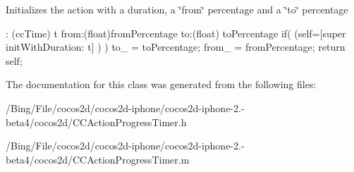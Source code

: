 Initializes the action with a duration, a \char`\"{}from\char`\"{} percentage and a \char`\"{}to\char`\"{} percentage 
\begin{DoxyCode}
                      : (ccTime) t from:(float)fromPercentage to:(float) 
      toPercentage
{
        if( (self=[super initWithDuration: t] ) ){
                to_ = toPercentage;
                from_ = fromPercentage;
        }
        return self;
}
\end{DoxyCode}


The documentation for this class was generated from the following files\-:\begin{DoxyCompactItemize}
\item 
/\-Bing/\-File/cocos2d/cocos2d-\/iphone/cocos2d-\/iphone-\/2.-\/beta4/cocos2d/C\-C\-Action\-Progress\-Timer.\-h\item 
/\-Bing/\-File/cocos2d/cocos2d-\/iphone/cocos2d-\/iphone-\/2.-\/beta4/cocos2d/C\-C\-Action\-Progress\-Timer.\-m\end{DoxyCompactItemize}
